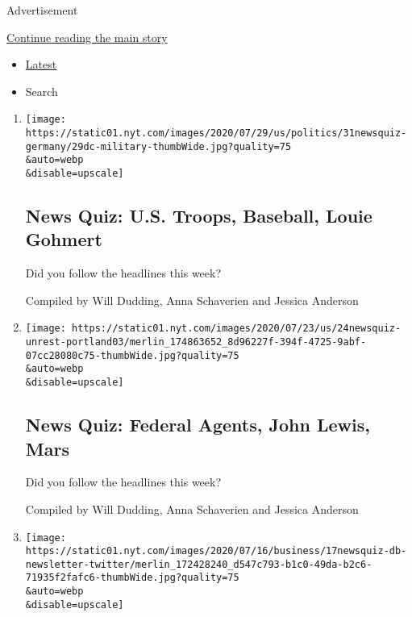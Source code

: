 Advertisement

\protect\hyperlink{after-subheader}{Continue reading the main story}

\begin{itemize}
\tightlist
\item
  \protect\hyperlink{stream-panel}{Latest}
\item
  Search
\end{itemize}

\begin{enumerate}
\def\labelenumi{\arabic{enumi}.}
\item
  \href{/interactive/2020/07/31/briefing/troops-baseball-louie-gohmert-news-quiz.html}{}

  \texttt{[image: https://static01.nyt.com/images/2020/07/29/us/politics/31newsquiz-germany/29dc-military-thumbWide.jpg?quality=75\\\&auto=webp\\\&disable=upscale]}

  \hypertarget{news-quiz-us-troops-baseball-louie-gohmert}{%
  \subsection{News Quiz: U.S. Troops, Baseball, Louie
  Gohmert}\label{news-quiz-us-troops-baseball-louie-gohmert}}

  Did you follow the headlines this week?

  Compiled by Will Dudding, Anna Schaverien and Jessica Anderson
\item
  \href{/interactive/2020/07/24/briefing/federal-agents-john-lewis-mars-news-quiz.html}{}

  \texttt{[image: https://static01.nyt.com/images/2020/07/23/us/24newsquiz-unrest-portland03/merlin\_174863652\_8d96227f-394f-4725-9abf-07cc28080c75-thumbWide.jpg?quality=75\\\&auto=webp\\\&disable=upscale]}

  \hypertarget{news-quiz-federal-agents-john-lewis-mars}{%
  \subsection{News Quiz: Federal Agents, John Lewis,
  Mars}\label{news-quiz-federal-agents-john-lewis-mars}}

  Did you follow the headlines this week?

  Compiled by Will Dudding, Anna Schaverien and Jessica Anderson
\item
  \href{/interactive/2020/07/17/briefing/china-twitter-disney-news-quiz.html}{}

  \texttt{[image: https://static01.nyt.com/images/2020/07/16/business/17newsquiz-db-newsletter-twitter/merlin\_172428240\_d547c793-b1c0-49da-b2c6-71935f2fafc6-thumbWide.jpg?quality=75\\\&auto=webp\\\&disable=upscale]}


\end{enumerate}
